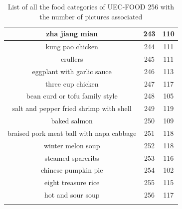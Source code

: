 {\begin{longtable}{| c | c | c|}
        \hline
        zha jiang mian  &  243  &  110  \\
        \hline
        kung pao chicken  &  244  &  111  \\
        \hline
        crullers  &  245  &  111  \\
        \hline
        eggplant with garlic sauce  &  246  &  113  \\
        \hline
        three cup chicken  &  247  &  117  \\
        \hline
        bean curd or tofu family style  &  248  &  105  \\
        \hline
        salt and pepper fried shrimp with shell  &  249  &  119  \\
        \hline
        baked salmon  &  250  &  109  \\
        \hline
        braised pork meat ball with napa cabbage  &  251  &  118  \\
        \hline
        winter melon soup  &  252  &  118  \\
        \hline
        steamed spareribs  &  253  &  116  \\
        \hline
        chinese pumpkin pie  &  254  &  102  \\
        \hline
        eight treasure rice  &  255  &  115  \\
        \hline
        hot and sour soup  &  256  &  117  \\
        
        \hline
         \caption{List of all the food categories of UEC-FOOD 256 with the number of pictures associated}
         \label{table:list_food}
    \end{longtable}
}


